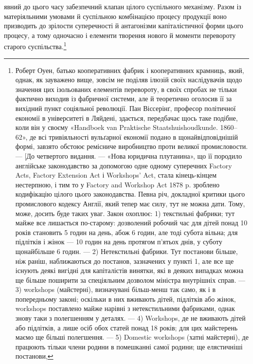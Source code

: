 \parcont{}  %
явний до цього часу забезпечний клапан цілого суспільного
механізму. Разом із матеріяльними умовами й суспільною комбінацією
процесу продукції воно призводить до зрілости суперечності
й антагонізми капіталістичної форми цього процесу,
а тому одночасно і елементи творення нового й моменти перевороту
старого суспільства.\footnote{
Роберт Оуен, батько кооперативних фабрик і кооперативних
крамниць, який, однак, як зауважено вище, зовсім не поділяв ілюзій
своїх наслідувачів щодо значення цих ізольованих елементів перевороту,
в своїх спробах не тільки фактично виходив із фабричної системи,
але й теоретично оголосив її за вихідний пункт соціяльної революції.
Пан Віссерінґ, професор політичної економії в університеті в Ляйдені,
здається, передбачає щось таке подібне, коли він у своєму «Handboek
van Praktische Staatshuishoudkunde. 1860--62», де всі тривіяльності
вульґарної економії подано в щонайвідповіднішій формі, завзято обстоює
ремісниче виробництво проти великої промисловости. — [До четвертого видання.
— «Нова юридична плутанина», що її породило англійське законодавство
за допомогою одне одному суперечних Factory Acts, Factory
Extension Act і Workshops’ Act, стала кінець-кінцем нестерпною, і
тим то у Factory and Workshop Act 1878 p. зроблено кодифікацію цілого
цього законодавства. Певна річ, докладної критики цього промислового
кодексу Англії, який тепер має силу, тут не можна дати. Тому, може,
досить буде таких уваг. Закон охоплює: 1) текстильні фабрики; тут
майже все лишається по-старому: дозволений робочий час для дітей
понад 10 років становить 5 годин на день, абож 6 годин, але тоді субота
вільна; для підлітків і жінок — 10 годин на день протягом п’ятьох
днів, у суботу щонайбільше 6 годин. — 2) Нетекстильні фабрики. Тут
постанови більше, ніж раніш, наближаються до постанов, зазначених у
пункті 1, але все ще існують деякі вигідні для капіталістів винятки, які
в деяких випадках можна ще більше поширити за спеціяльним дозволом
міністра внутрішніх справ. — 3) workshops (майстерні), визначувані
більш-менш так само, як і в попередньому законі; оскільки в них вживають
дітей, підлітків або жінок, workshops поставлено майже нарівні
з нетекстильними фабриками, однак знову таки з полегшенням у деталях.
— 4) Workshops, де не вживають дітей або підлітків, а лише осіб
обох статей понад 18 років; для цих майстерень маємо ще більші полегшення.
— 5) Domestic workshops (хатні майстерні), де працюють тільки
члени родини в помешканні самої родини; ще елястичніші постанови,
}
